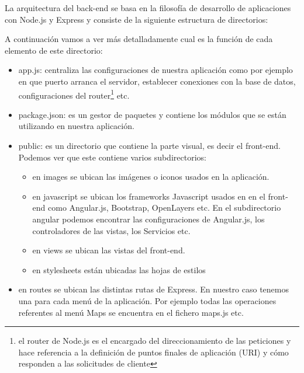 \newpage

La arquitectura del back-end se basa en la filosofía de desarrollo de aplicaciones con Node.js y Express y consiste de la siguiente estructura de directorios:


\newpage

A continuación vamos a ver más detalladamente cual es la función de cada elemento de este directorio:
\begin{itemize}
	\item app.js: centraliza las configuraciones de nuestra aplicación como por ejemplo en que puerto arranca el servidor, establecer conexiones con la base de datos, configuraciones del router\footnote{el router de Node.js es el encargado del direccionamiento de las peticiones y hace referencia a la definición de puntos finales de aplicación (URI) y cómo responden a las solicitudes de cliente} etc.
	\item package.json: es un gestor de paquetes y contiene los módulos que se están utilizando en nuestra aplicación.
	\item public: es un directorio que contiene la parte visual, es decir el front-end. Podemos ver que este contiene varios subdirectorios:
	\begin{itemize}
	\item en images se ubican las imágenes o iconos usados en la aplicación.
	\item en javascript se ubican los frameworks Javascript usados en en el front-end como Angular.js, Bootstrap, OpenLayers etc. En el subdirectorio angular podemos encontrar las configuraciones de Angular.js, los controladores de las vistas, los Servicios etc.
	\item en views se ubican las vistas del front-end.
	\item en stylesheets están ubicadas las hojas de estilos
	\end{itemize}
	\item en routes se ubican las distintas rutas de Express. En nuestro caso tenemos una para cada menú de la aplicación. Por ejemplo todas las operaciones referentes al menú Maps se encuentra en el fichero maps.js etc.
\end{itemize}

